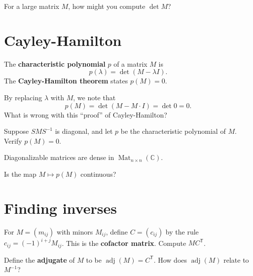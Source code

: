 \documentclass{homework}
\DeclareMathOperator{\Mat}{Mat}
\DeclareMathOperator{\adj}{adj}
\begin{document}
\begin{problem}
  For a large matrix $M$, how might you compute $\det M$?
\end{problem}

\section{Cayley-Hamilton}

\begin{problem}
  The \textbf{characteristic polynomial} $p$ of a matrix $M$ is
  \[
    p(\lambda) = \det(M - \lambda I).
  \]
  The \textbf{Cayley-Hamilton theorem} states $p(M) = 0$.

  By replacing $\lambda$ with $M$, we note that
  \[
    p(M) = \det(M - M \cdot I) = \det 0 = 0.
  \]
  What is wrong with this ``proof'' of Cayley-Hamilton?
\end{problem}

\begin{problem}
  Suppose $SMS^{-1}$ is diagonal, and let $p$ be the characteristic polynomial of $M$.  Verify $p(M) = 0$.
\end{problem}

\begin{problem}
  Diagonalizable matrices are dense in $\Mat_{n \times n}(\mathbb{C})$.
\end{problem}

\begin{problem}
  Is the map $M \mapsto p(M)$ continuous?
\end{problem}

\section{Finding inverses}

\begin{problem}
  For $M = (m_{ij})$ with minors $M_{ij}$, define $C = (c_{ij})$ by
  the rule $c_{ij} = (-1)^{i+j} M_{ij}$.  This is the \textbf{cofactor
    matrix}.  Compute $MC^{\textsf{T}}$.
\end{problem}

\begin{problem}
  Define the \textbf{adjugate} of $M$ to be $\adj(M) = C^{\textsf{T}}$.
    How does $\adj(M)$ relate to $M^{-1}$?
\end{problem}
\end{document}
